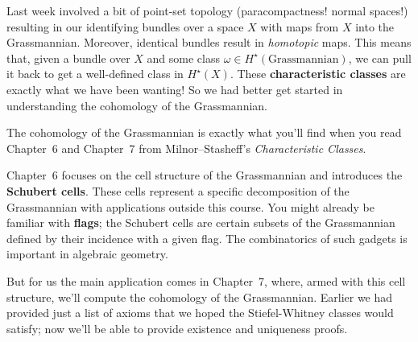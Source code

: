 \documentclass{homework}
\author{Jim Fowler}
\date{Week 5: Cohomology of Grassmannian}
\begin{document}
\maketitle

Last week involved a bit of point-set topology (paracompactness!
normal spaces!) resulting in our identifying bundles over a space $X$
with maps from $X$ into the Grassmannian.  Moreover, identical bundles
result in \textit{homotopic} maps.  This means that, given a bundle
over $X$ and some class $\omega \in H^\star(\mbox{Grassmannian})$, we
can pull it back to get a well-defined class in $H^\star(X)$.  These
\textbf{characteristic classes} are exactly what we have been wanting!
So we had better get started in understanding the cohomology of the
Grassmannian.

The cohomology of the Grassmannian is exactly what you'll find when
you read Chapter~6 and Chapter~7 from Milnor--Stasheff's
\textit{Characteristic Classes}.

Chapter~6 focuses on the cell structure of the Grassmannian and
introduces the \textbf{Schubert cells}. These cells represent a
specific decomposition of the Grassmannian with applications outside
this course. You might already be familiar with \textbf{flags}; the
Schubert cells are certain subsets of the Grassmannian defined by
their incidence with a given flag.  The combinatorics of such gadgets
is important in algebraic geometry.

But for us the main application comes in Chapter~7, where, armed with
this cell structure, we'll compute the cohomology of the Grassmannian.
Earlier we had provided just a list of axioms that we hoped the
Stiefel-Whitney classes would satisfy; now we'll be able to provide
existence and uniqueness proofs.
\end{document}
